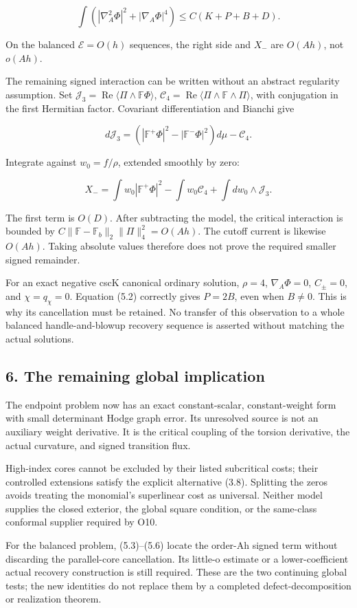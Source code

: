 \documentclass[
  11pt,
]{article}
\begin{document}
\[
 \int(|\nabla_A^2\Phi|^2+|\nabla_A\Phi|^4)
                  \le C(K+P+B+D).
 \tag{5.5}
\]

On the balanced \(\mathcal E=O(h)\) sequences, the right side and
\(X_-\) are \(O(Ah)\), not \(o(Ah)\).

The remaining signed interaction can be written without an abstract
regularity assumption. Set
\(\mathcal J_3=\operatorname{Re}\langle\Pi\wedge\mathbb F\Phi\rangle\),
\(\mathcal C_4=\operatorname{Re}\langle\Pi\wedge\mathbb F\wedge\Pi\rangle\),
with conjugation in the first Hermitian factor. Covariant
differentiation and Bianchi give

\[
 d\mathcal J_3=(|\mathbb F^+\Phi|^2-|\mathbb F^-\Phi|^2)d\mu
                          -\mathcal C_4.
\]

Integrate against \(w_0=f/\rho\), extended smoothly by zero:

\[
 X_-=\int w_0|\mathbb F^+\Phi|^2-
           \int w_0\mathcal C_4+\int dw_0\wedge\mathcal J_3.
 \tag{5.6}
\]

The first term is \(O(D)\). After subtracting the model, the critical
interaction is bounded by
\(C\|\mathbb F-\mathbb F_b\|_2\|\Pi\|_4^2=O(Ah)\). The cutoff current is
likewise \(O(Ah)\). Taking absolute values therefore does not prove the
required smaller signed remainder.

For an exact negative cscK canonical ordinary solution, \(\rho=4\),
\(\nabla_A\Phi=0\), \(C_\pm=0\), and \(\chi=q_\chi=0\). Equation (5.2)
correctly gives \(P=2B\), even when \(B\ne0\). This is why its
cancellation must be retained. No transfer of this observation to a
whole balanced handle-and-blowup recovery sequence is asserted without
matching the actual solutions.

\hypertarget{the-remaining-global-implication}{%
\subsection{6. The remaining global
implication}\label{the-remaining-global-implication}}

The endpoint problem now has an exact constant-scalar, constant-weight
form with small determinant Hodge graph error. Its unresolved source is
not an auxiliary weight derivative. It is the critical coupling of the
torsion derivative, the actual curvature, and signed transition flux.

High-index cores cannot be excluded by their listed subcritical costs;
their controlled extensions satisfy the explicit alternative (3.8).
Splitting the zeros avoids treating the monomial's superlinear cost as
universal. Neither model supplies the closed exterior, the global square
condition, or the same-class conformal supplier required by O10.

For the balanced problem, (5.3)--(5.6) locate the order-Ah signed term
without discarding the parallel-core cancellation. Its little-o estimate
or a lower-coefficient actual recovery construction is still required.
These are the two continuing global tests; the new identities do not
replace them by a completed defect-decomposition or realization theorem.
\end{document}
